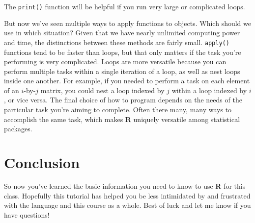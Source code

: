 \documentclass[12pt]{article}\usepackage[]{graphicx}\usepackage[]{color}
\begin{document}
The \verb|print()| function will be helpful if you run very large or complicated loops.

But now we've seen multiple ways to apply functions to objects. Which should we use in which situation? Given that we have nearly unlimited computing power and time, the distinctions between these methods are fairly small. \verb|apply()| functions tend to be faster than loops, but that only matters if the task you're performing is very complicated. Loops are more versatile because you can perform multiple tasks within a single iteration of a loop, as well as nest loops inside one another. For example, if you needed to perform a task on each element of an $i$-by-$j$ matrix, you could nest a loop indexed by $j$ within a loop indexed by $i$, or vice versa. The final choice of how to program depends on the needs of the particular task you're aiming to complete. Often there many, many ways to accomplish the same task, which makes \textbf{R} uniquely versatile among statistical packages.

\section{Conclusion}\label{sec:conclusion}
So now you've learned the basic information you need to know to use \textbf{R} for this class. Hopefully this tutorial has helped you be less intimidated by and frustrated with the language and this course as a whole. Best of luck and let me know if you have questions!




%
%
\end{document}
